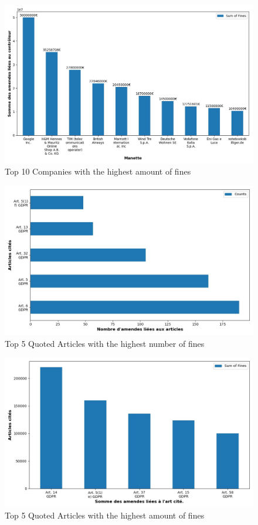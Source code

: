 \documentclass[12pt]{article}
\begin{document}
	\begin{figure}
		[H]\centering\includegraphics[width=0.6\linewidth]{graphs/top10_controller_fines}
		\caption{Top 10 Companies with the highest amount of fines}
	 \end{figure}



\newpage


	\begin{multicols}{2}
	\begin{figure}
		[H]\centering\includegraphics[width=1\linewidth]{graphs/top10_quoted} 
		\caption{Top 5 Quoted Articles with the highest number of fines}
	\end{figure}
	\begin{figure}
		[H]\centering\includegraphics[width=1\linewidth]{graphs/top10_quoted_fines} 
		\caption{Top 5  Quoted Articles with the highest amount of fines}
	\end{figure}
	\end{multicols}
	
\end{document}
